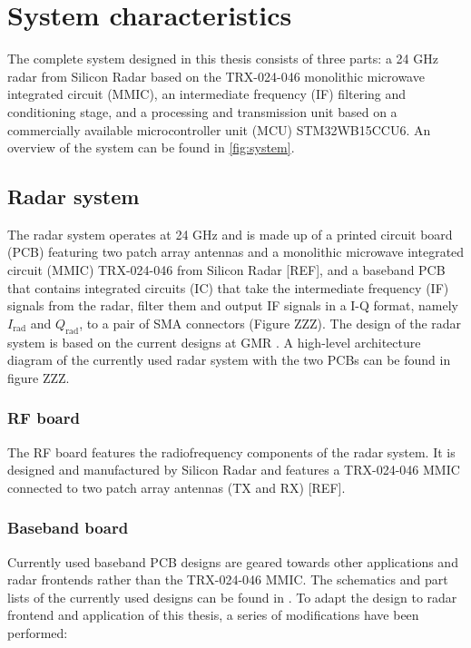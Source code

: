 	\chapter{System characteristics}
	
	The complete system designed in this thesis consists of three parts: a 24 GHz radar from Silicon Radar based on the TRX-024-046 monolithic microwave integrated circuit (MMIC), an intermediate frequency (IF) filtering and conditioning stage, and a processing and transmission unit based on a commercially available microcontroller unit (MCU) STM32WB15CCU6. An overview of the system can be found in \cref{fig:system}.
	
	\section{Radar system} \label{sec:radar_sys}
	
	The radar system operates at 24 GHz and is made up of a printed circuit board (PCB) featuring two patch array antennas and a monolithic microwave integrated circuit (MMIC) TRX-024-046 from Silicon Radar [REF], and a baseband PCB that contains integrated circuits (IC) that take the intermediate frequency (IF) signals from the radar, filter them and output IF signals in a I-Q format, namely $I_\mathrm{rad}$ and $Q_\mathrm{rad}$, to a pair of SMA connectors (Figure ZZZ). The design of the radar system is based on the current designs at GMR \cite{Montesano2019}. A high-level architecture diagram of the currently used radar system with the two PCBs can be found in figure ZZZ. 
	
	\subsection{RF board}
	
	The RF board features the radiofrequency components of the radar system. It is designed and manufactured by Silicon Radar and features a TRX-024-046 MMIC connected to two patch array antennas (TX and RX) [REF].
	
	
	\subsection{Baseband board}
	
	Currently used baseband PCB designs are geared towards other applications and radar frontends rather than the TRX-024-046 MMIC. The schematics and part lists of the currently used designs can be found in \cite{Sardinero2022, Montesano2019}. To adapt the design to radar frontend and application of this thesis, a series of modifications have been performed:
